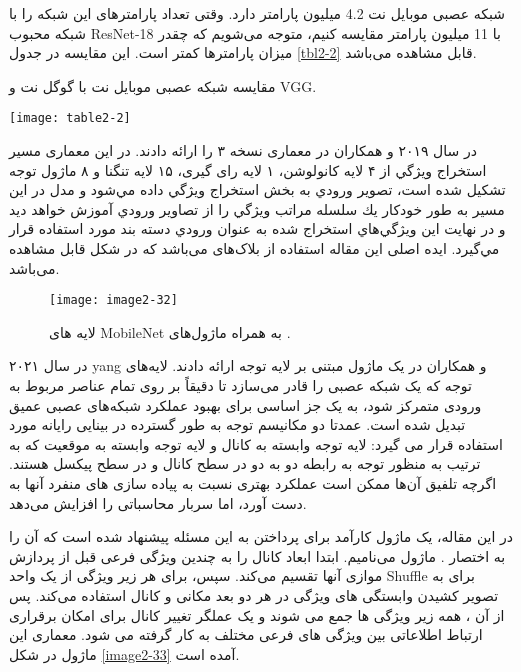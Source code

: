 \noindent
شبکه عصبی موبایل نت 4.2 میلیون پارامتر دارد. وقتی تعداد پارامترهای این شبکه را با شبکه محبوب ResNet-18 با 11 میلیون پارامتر مقایسه کنیم، متوجه می‌شویم که چقدر میزان پارامترها کمتر است. این مقایسه در جدول \ref{tbl2-2} قابل مشاهده می‌باشد.

\begin{table}
\centering
  \caption{ مقایسه شبکه عصبی موبایل نت با گوگل نت و VGG.}
  \label{tbl2-2}
  \texttt{[image: table2-2]}
\end{table}

\noindent
در سال ۲۰۱۹   و همکاران در \cite{howard2019searching} معماری  نسخه ۳ را ارائه دادند. در این معماری مسير استخراج ويژگي از ۴ لايه كانولوشن، ۱ لایه رای گیری، ۱۵ لايه تنگنا   و ۸ ماژول توجه  تشکیل شده است، تصوير ورودي به بخش استخراج ويژگي داده مي‌شود و مدل در اين مسير به طور خودكار يك سلسله مراتب ويژگي را از تصاوير ورودي آموزش خواهد ديد و در نهايت اين ويژگي‌هاي استخراج شده به عنوان ورودي دسته بند مورد استفاده قرار مي‌گيرد. ایده اصلی این مقاله استفاده از بلاک‌های  می‌باشد که در شکل  قابل مشاهده می‌باشد.

\begin{figure}[h]
\centering
  \texttt{[image: image2-32]}
  \caption{
لایه های MobileNet به همراه ماژول‌های 
   \cite{yang2021sanet}.}
  \label{image2-32}
\end{figure}

\noindent
در سال ۲۰۲۱ yang و همکاران در \cite{yang2021sanet} یک ماژول مبتنی بر لایه توجه ارائه دادند. لایه‌های توجه که یک شبکه عصبی را قادر می‌سازد تا دقیقاً بر روی تمام عناصر مربوط به ورودی متمرکز شود، به یک جز اساسی برای بهبود عملکرد شبکه‌های عصبی عمیق تبدیل شده است. عمدتا دو مکانیسم توجه به طور گسترده در بینایی رایانه مورد استفاده قرار می گیرد: لایه توجه وابسته به كانال  و لایه توجه وابسته به موقعيت  که به ترتیب به منظور توجه به رابطه دو به دو در سطح کانال و در سطح پیکسل هستند. اگرچه تلفیق آن‌ها ممکن است عملکرد بهتری نسبت به پیاده سازی های منفرد آنها به دست آورد‌، اما سربار محاسباتی را افزایش می‌دهد.

\noindent
در این مقاله، یک ماژول  کارآمد برای پرداختن به این مسئله پیشنهاد شده است که آن را به اختصار . ماژول  می‌نامیم. ابتدا ابعاد کانال را به چندین ویژگی فرعی قبل از پردازش موازی آنها تقسیم می‌کند. سپس، برای هر زیر ویژگی از یک واحد Shuffle برای به تصویر کشیدن وابستگی های ویژگی در هر دو بعد مکانی و کانال استفاده می‌کند. پس از آن ، همه زیر ویژگی ها جمع می شوند و یک عملگر تغییر کانال برای امکان برقراری ارتباط اطلاعاتی بین ویژگی های فرعی مختلف به کار گرفته می شود. معماری این ماژول در شکل \ref{image2-33} آمده است.

